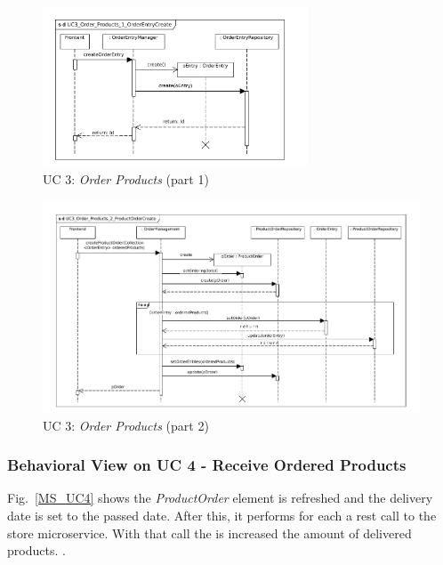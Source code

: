 		
			\begin{figure}[!h]
				\centering
				\includegraphics[width = 0.7\textwidth]{img/UC3_Order_Products_1_OrderEntryCreate.pdf}
				\caption{UC 3: \textit{Order Products} (part 1)}
				\label{MS_UC3_1}
			\end{figure}
			
			\begin{figure}[!h]
				\centering
				\includegraphics[width = 1\textwidth]{img/UC3_Order_Products_2_ProductOrderCreate.pdf}
				\caption{UC 3: \textit{Order Products} (part 2)}
				\label{MS_UC3_2}
			\end{figure}
		
		\subsubsection*{Behavioral View on UC 4 - Receive Ordered Products}
		Fig.~\ref{MS_UC4} shows the \textit{ProductOrder} element
		 is refreshed and the delivery date is set to the passed date.
		After this, it performs for each  a rest call to the store microservice. With that  call the  is increased the amount of delivered products.
		.
			
